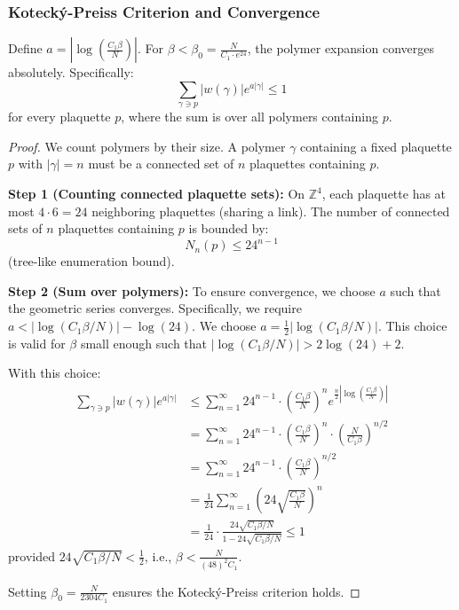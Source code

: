 \subsubsection{Kotecký-Preiss Criterion and Convergence}

\begin{theorem}
\label{thm:kp_rigorous}
Define $a = |\log(\frac{C_1\beta}{N})|$. For $\beta < \beta_0 = \frac{N}{C_1 \cdot e^{24}}$, the polymer expansion converges absolutely. Specifically:
\begin{equation}
\sum_{\gamma \ni p} |w(\gamma)| e^{a|\gamma|} \leq 1
\end{equation}
for every plaquette $p$, where the sum is over all polymers containing $p$.
\end{theorem}

\begin{proof}
We count polymers by their size. A polymer $\gamma$ containing a fixed plaquette $p$ with $|\gamma| = n$ must be a connected set of $n$ plaquettes containing $p$.

\textbf{Step 1 (Counting connected plaquette sets):}
On $\mathbb{Z}^4$, each plaquette has at most $4 \cdot 6 = 24$ neighboring plaquettes (sharing a link). The number of connected sets of $n$ plaquettes containing $p$ is bounded by:
\begin{equation}
N_n(p) \leq 24^{n-1}
\end{equation}
(tree-like enumeration bound).

\textbf{Step 2 (Sum over polymers):}
To ensure convergence, we choose $a$ such that the geometric series converges. Specifically, we require $a < |\log(C_1\beta/N)| - \log(24)$. We choose $a = \frac{1}{2}|\log(C_1\beta/N)|$. This choice is valid for $\beta$ small enough such that $|\log(C_1\beta/N)| > 2\log(24) + 2$.

With this choice:
\begin{align}
\sum_{\gamma \ni p} |w(\gamma)| e^{a|\gamma|} &\leq \sum_{n=1}^\infty 24^{n-1} \cdot \left(\frac{C_1\beta}{N}\right)^n e^{\frac{n}{2}|\log(\frac{C_1\beta}{N})|} \\
&= \sum_{n=1}^\infty 24^{n-1} \cdot \left(\frac{C_1\beta}{N}\right)^n \cdot \left(\frac{N}{C_1\beta}\right)^{n/2} \\
&= \sum_{n=1}^\infty 24^{n-1} \cdot \left(\frac{C_1\beta}{N}\right)^{n/2} \\
&= \frac{1}{24} \sum_{n=1}^\infty \left(24\sqrt{\frac{C_1\beta}{N}}\right)^n \\
&= \frac{1}{24} \cdot \frac{24\sqrt{C_1\beta/N}}{1 - 24\sqrt{C_1\beta/N}} \leq 1
\end{align}
provided $24\sqrt{C_1\beta/N} < \frac{1}{2}$, i.e., $\beta < \frac{N}{(48)^2 C_1}$.

Setting $\beta_0 = \frac{N}{2304 C_1}$ ensures the Kotecký-Preiss criterion holds.
\end{proof}

